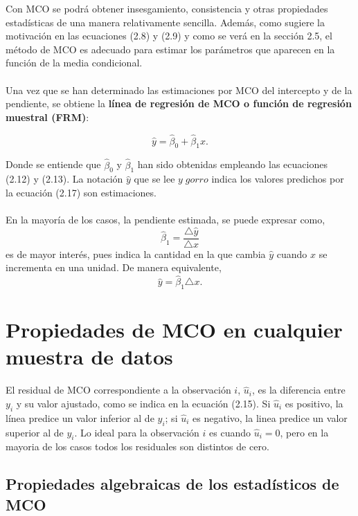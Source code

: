 Con MCO se podrá obtener insesgamiento, consistencia y otras propiedades estadísticas de una manera relativamente sencilla. Además, como sugiere la motivación en las ecuaciones (2.8) y (2.9)  y como se verá en la sección 2.5, el método de MCO es adecuado para estimar los parámetros que aparecen en la función de la media condicional.\\\\

Una vez que se han determinado las estimaciones por MCO del intercepto y de la pendiente,
se obtiene la \textbf{línea de regresión de MCO o función de regresión muestral (FRM)}:

\begin{tcolorbox}[colframe=white]
    \begin{equation}
	\hat{y} = \hat{\beta}_0 + \hat{\beta}_1 x.
    \end{equation}
\end{tcolorbox}

Donde se entiende que $\hat{\beta}_0$ y $\hat{\beta}_1$ han sido obtenidas empleando las ecuaciones (2.12) y (2.13). La notación $\hat{y}$ que se lee $y \; gorro$ indica los valores predichos por la ecuación (2.17) son estimaciones. \\\\
En la mayoría de los casos, la pendiente estimada, se puede expresar como,
\begin{equation}
    \hat{\beta}_1 = \dfrac{\triangle \hat{y}}{\triangle x}
\end{equation}
es de mayor interés, pues indica la cantidad en la que cambia $\hat{y}$ cuando $x$ se incrementa en una unidad. De manera equivalente,
\begin{equation}
    \hat{y} =  \hat{\beta}_1 \triangle x.
\end{equation}

\section{Propiedades de MCO en cualquier muestra de datos}
El residual de MCO correspondiente a la observación $i$, $\hat{u}_i$, es la diferencia entre $y_i$ y su valor ajustado, como se indica en la ecuación (2.15). Si $\hat{u}_i$ es positivo, la línea predice un valor inferior al de $y_i$; si $\hat{u}_i$ es negativo, la linea predice un valor superior al de $y_i$. Lo ideal para la observación $i$ es cuando $\hat{u}_i = 0$, pero en la mayoria de los casos todos los residuales son distintos de cero. 

\subsection{Propiedades algebraicas de los estadísticos de MCO}
